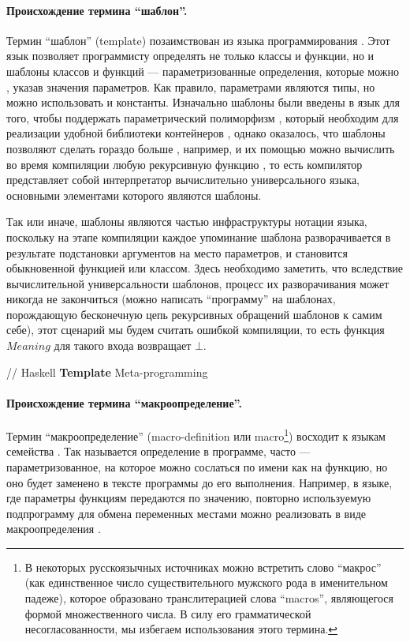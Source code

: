 \paragraph*{Происхождение термина ``шаблон''.} Термин ``шаблон'' (template) позаимствован из языка программирования  \cite{???}. Этот язык позволяет программисту определять не только классы и функции, но и шаблоны классов и функций --- параметризованные определения, которые можно , указав значения параметров. Как правило, параметрами являются типы, но можно использовать и константы. Изначально шаблоны были введены в язык для того, чтобы поддержать параметрический полиморфизм \cite{???}, который необходим для реализации удобной библиотеки контейнеров \cite{???}, однако оказалось, что шаблоны позволяют сделать гораздо больше \cite{???}, например, и их помощью можно вычислить во время компиляции любую рекурсивную функцию \cite{???}, то есть компилятор  представляет собой интерпретатор вычислительно универсального языка, основными элементами которого являются шаблоны.

Так или иначе, шаблоны являются частью инфраструктуры нотации языка, поскольку на этапе компиляции каждое упоминание шаблона разворачивается в результате подстановки аргументов на место параметров, и становится обыкновенной функцией или классом. Здесь необходимо заметить, что вследствие вычислительной универсальности шаблонов, процесс их разворачивания может никогда не закончиться (можно написать ``программу'' на шаблонах, порождающую бесконечную цепь рекурсивных обращений шаблонов к самим себе), этот сценарий мы будем считать ошибкой компиляции, то есть функция $Meaning$ для такого входа возвращает $\bot$.

// Haskell \textbf{Template} Meta-programming

\paragraph*{Происхождение термина ``макроопределение''.} Термин ``макроопределение'' (macro-definition или macro\footnote{В некоторых русскоязычных источниках можно встретить слово ``макрос'' (как единственное число существительного мужского рода в именительном падеже), которое образовано транслитерацией слова ``macros'', являющегося формой множественного числа. В силу его грамматической несогласованности, мы избегаем использования этого термина.}) восходит к языкам семейства  \cite{???}. Так называется определение в программе, часто --- параметризованное, на которое можно сослаться по имени как на функцию, но оно будет заменено в тексте программы до его выполнения. Например, в языке, где параметры функциям передаются по значению, повторно используемую подпрограмму для обмена переменных местами можно реализовать в виде макроопределения \cite{???}.

